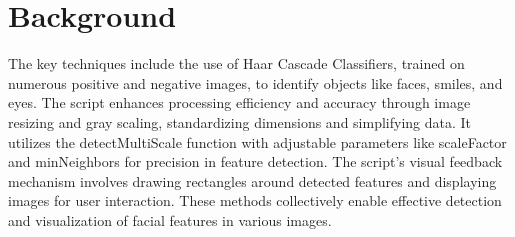 \documentclass[11pt, a4paper, twocolumn]{article}
\begin{document}
\section*{Background}
 The key techniques include the use of Haar Cascade Classifiers, trained on numerous positive and negative images, to identify objects like faces, smiles, and eyes. The script enhances processing efficiency and accuracy through image resizing and gray scaling, standardizing dimensions and simplifying data. It utilizes the detectMultiScale function with adjustable parameters like scaleFactor and minNeighbors for precision in feature detection. The script's visual feedback mechanism involves drawing rectangles around detected features and displaying images for user interaction. These methods collectively enable effective detection and visualization of facial features in various images.
\end{document}
